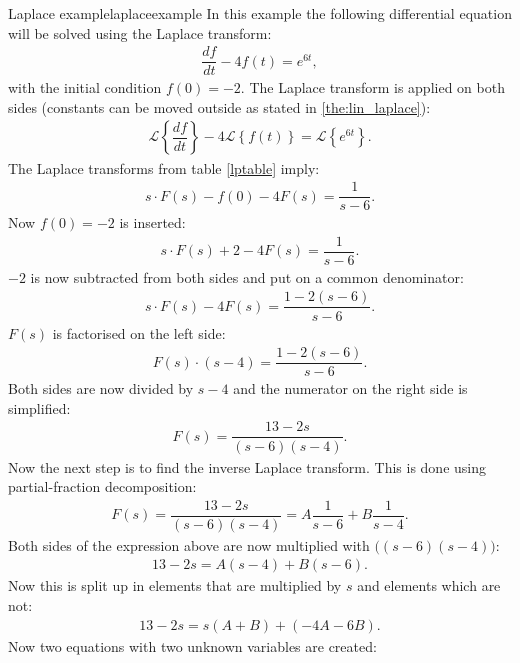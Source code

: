 \begin{example}{Laplace example}{laplaceexample}
In this example the following differential equation will be solved using the Laplace transform:
\begin{align}
\dfrac{df}{dt}-4f(t)=e^{6t}, \label{eq:lap_ex}
\end{align} 
with the initial condition $f(0)=-2$. The Laplace transform is applied on both sides (constants can be moved outside as stated in \cref{the:lin_laplace}):
\begin{align*}
\mathcal{L} \left\{\dfrac{df}{dt} \right\}-4 
\mathcal{L} \left\{f(t) \right\} = 
\mathcal{L} \left\{e^{6t} \right\}.
\end{align*}
The Laplace transforms from table \ref{lptable} imply:
\begin{align*}
s \cdot F(s) - f(0) - 4F(s)= \dfrac{1}{s-6}.
\end{align*}
Now $f(0)=-2$ is inserted:
\begin{align*}
s \cdot F(s) + 2 - 4F(s)= \dfrac{1}{s-6}.
\end{align*}
$-2$ is now subtracted from both sides and put on a common denominator:
\begin{align*}
s \cdot F(s) - 4F(s)= \dfrac{1-2(s-6)}{s-6}.
\end{align*}
$F(s)$ is factorised on the left side:
\begin{align*}
F(s) \cdot (s-4) = \dfrac{1-2(s-6)}{s-6}.
\end{align*}
Both sides are now divided by $s-4$ and the numerator on the right side is simplified:
\begin{align*}
F(s) = \dfrac{13-2s}{(s-6)(s-4)}.
\end{align*}
Now the next step is to find the inverse Laplace transform. This is done using partial-fraction decomposition: \cite[p. 537]{calc}
\begin{align}
F(s) = \dfrac{13-2s}{(s-6)(s-4)} = A \dfrac{1}{s-6} + B \dfrac{1}{s-4}.
\label{par_dec}
\end{align}
Both sides of the expression above are now multiplied with $\big((s-6)(s-4)\big)$:
\begin{align*}
13-2s = A(s-4) + B(s-6).
\end{align*}
Now this is split up in elements that are multiplied by $s$ and elements which are not:
\begin{align*}
13-2s = s(A+B)+(-4A-6B).
\end{align*}
Now two equations with two unknown variables are created:
\begin{align*}

\end{align*}
\end{example}
